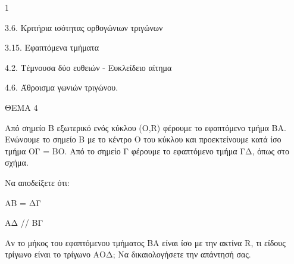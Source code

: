 \begin{ylh}{1}
    \item 3.6. Κριτήρια ισότητας ορθογώνιων τριγώνων
    \item 3.15. Εφαπτόμενα τμήματα
    \item 4.2. Τέμνουσα δύο ευθειών - Ευκλείδειο αίτημα
    \item 4.6. Άθροισμα γωνιών τριγώνου.
\end{ylh}

ΘΕΜΑ 4

Από σημείο Β εξωτερικό ενός κύκλου (Ο,R) φέρουμε το εφαπτόμενο τμήμα ΒΑ. Ενώνουμε το σημείο Β με το κέντρο Ο του κύκλου και προεκτείνουμε κατά ίσο τμήμα ΟΓ = ΒΟ. Από το σημείο Γ φέρουμε το εφαπτόμενο τμήμα ΓΔ, όπως στο σχήμα.

\begin{alist}
\item Να αποδείξετε ότι:

\begin{alist}
\item
  ΑΒ = ΔΓ 
\item
  ΑΔ // ΒΓ 

\item Αν το μήκος του εφαπτόμενου τμήματος ΒΑ είναι ίσο με την ακτίνα R, τι είδους τρίγωνο είναι το τρίγωνο ΑΟΔ; Να δικαιολογήσετε την απάντησή σας. 


\begin{center}
\end{center}
\end{alist}
\end{alist}
